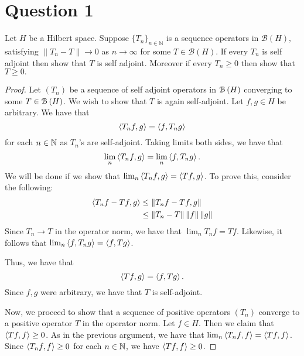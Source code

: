 \section{Question 1}
\horz

Let $H$ be a Hilbert space. Suppose $\{T_n\}_{n\in\mathbb N}$ is a sequence operators in $\mathcal B(H),$
satisfying $\|T_n-T\| \to 0$ as $n\to\infty$ for some $T\in \mathcal B(H).$ If every $T_n$ is self adjoint then show that $T$ is self adjoint. Moreover if every $T_n \geqslant 0$ then show that $T\geqslant 0.$

\horz

\begin{proof}
    Let $\left( T_{n} \right)$ be a sequence of self adjoint operators in ${\cal B} \left( H \right)$ converging to some $T\in {\cal B} \left( H \right)$. We wish to show that $T$ is again self-adjoint. Let $f,g \in H$ be arbitrary. We have that 
    \begin{equation*}
	\left\langle T_{n}f,g \right\rangle=\left\langle f,T_{n}g \right\rangle
    \end{equation*}
    for each $n\in \mathbb N$ as $T_{n}$'s are self-adjoint. Taking limits both sides, we have that
    \begin{equation*}
	\lim_{n} \left\langle T_{n}f,g \right\rangle = \lim_{n} \left\langle f, T_{n}g \right\rangle.
    \end{equation*}
    We will be done if we show that $\lim_{n} \left\langle T_{n}f,g \right\rangle = \left\langle Tf,g \right\rangle$. To prove this, consider the following:
    \begin{align*}
	\left\langle T_{n}f -Tf,g \right\rangle &\le \left\lVert T_{n}f-Tf, g \right\rVert \\
	& \le \left\lVert T_{n}-T \right\rVert\left\lVert f \right\rVert\left\lVert g \right\rVert
    \end{align*}
    Since $T_{n} \to T$ in the operator norm, we have that $\lim_{n} T_{n}f = Tf$. Likewise, it follows that $\lim_{n} \left\langle f,T_{n}g \right\rangle = \left\langle f, Tg \right\rangle$.

    Thus, we have that 
    \begin{equation*}
	\left\langle Tf, g \right\rangle = \left\langle f, Tg \right\rangle.
    \end{equation*}
    Since $f,g$ were arbitrary, we have that $T$ is self-adjoint.

    Now, we proceed to show that a sequence of positive operators $\left( T_{n} \right)$ converge to a positive operator $T$ in the operator norm. Let $f\in H$. Then we claim that $\left\langle Tf,f \right\rangle \ge 0$. As in the previous argument, we have that $\lim_{n} \left\langle T_{n}f,f \right\rangle = \left\langle Tf,f \right\rangle$. Since $\left\langle T_{n}f,f \right\rangle \ge 0$ for each $n\in \mathbb N$, we have $\left\langle Tf,f \right\rangle \ge 0$.
\end{proof}
